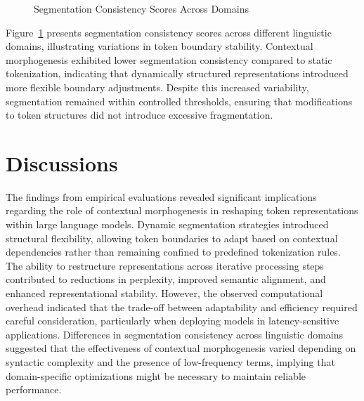 \documentclass{article}
\begin{document}
\begin{figure}[t]
	\centering
	\caption{Segmentation Consistency Scores Across Domains}
	\label{fig:segmentation_stability}
\end{figure}

Figure~\ref{fig:segmentation_stability} presents segmentation consistency scores across different linguistic domains, illustrating variations in token boundary stability. Contextual morphogenesis exhibited lower segmentation consistency compared to static tokenization, indicating that dynamically structured representations introduced more flexible boundary adjustments. Despite this increased variability, segmentation remained within controlled thresholds, ensuring that modifications to token structures did not introduce excessive fragmentation.


\section{Discussions}

The findings from empirical evaluations revealed significant implications regarding the role of contextual morphogenesis in reshaping token representations within large language models. Dynamic segmentation strategies introduced structural flexibility, allowing token boundaries to adapt based on contextual dependencies rather than remaining confined to predefined tokenization rules. The ability to restructure representations across iterative processing steps contributed to reductions in perplexity, improved semantic alignment, and enhanced representational stability. However, the observed computational overhead indicated that the trade-off between adaptability and efficiency required careful consideration, particularly when deploying models in latency-sensitive applications. Differences in segmentation consistency across linguistic domains suggested that the effectiveness of contextual morphogenesis varied depending on syntactic complexity and the presence of low-frequency terms, implying that domain-specific optimizations might be necessary to maintain reliable performance.
\end{document}
